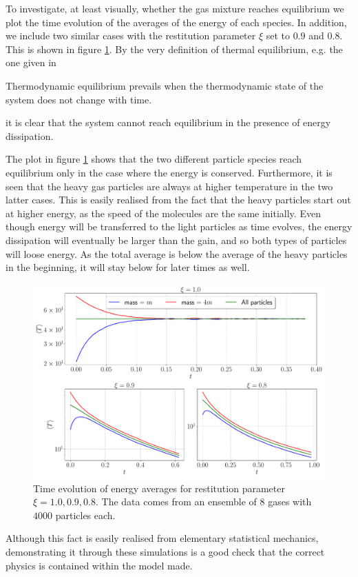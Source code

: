 To investigate, at least visually, whether the gas mixture reaches equilibrium we plot the time evolution of the averages of the energy of each species. In addition, we include two similar cases with the restitution parameter $\xi$ set to $0.9$ and $0.8$. This is shown in figure \ref{fig:averages}. By the very definition of thermal equilibrium, e.g. the one given in \cite[p.~3]{huang}
\begin{displayquote}
	Thermodynamic equilibrium prevails when the thermodynamic state of
	the system does not change with time.
\end{displayquote}
it is clear that the system cannot reach equilibrium in the presence of energy dissipation. 

The plot in figure \ref{fig:averages} shows that the two different particle species reach equilibrium only in the case where the energy is conserved. Furthermore, it is seen that the heavy gas particles are always at higher temperature in the two latter cases. This is easily realised from the fact that the heavy particles start out at higher energy, as the speed of the molecules are the same initially. Even though energy will be transferred to the light particles as time evolves, the energy dissipation will eventually be larger than the gain, and so both types of particles will loose energy. As the total average is below the average of the heavy particles in the beginning, it will stay below for later times as well. 

\begin{figure}[htb]
	\centering
	\includegraphics[width = \columnwidth]{../fig/energy_avg.pdf}
	\caption{Time evolution of energy averages for restitution parameter $\xi = 1.0,0.9,0.8$. The data comes from an ensemble of $8$ gases with $4000$ particles each.}
	\label{fig:averages}
\end{figure}

Although this fact is easily realised from elementary statistical mechanics, demonstrating it through these simulations is a good check that the correct physics is contained within the model made. 
